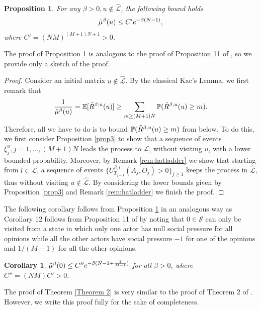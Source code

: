 \documentclass[11pt]{article}
\newtheorem{proposition}[theorem]{Proposition}
\newtheorem{corollary}[theorem]{Corollary}
\theoremstyle{definition}
\newcommand{\st}{\mathcal{S}}
\begin{document}
\begin{proposition}\label{theo2prop1}
     For any $\beta>0, u\notin\hat{\mathcal{L}}$, the following bound holds
    $$
        \Tilde{\mu}^\beta(u)\leq C'e^{-\beta(N-1)},
    $$
    where $C'=(NM)^{(M+1)N+1}>0$.
\end{proposition}

The proof of Proposition \ref{theo2prop1} is analogous to the proof of Proposition 11 of \cite{galves2024fastconsensusmetastabilityhighly}, so we provide only a sketch of the proof. 

\begin{proof}
Consider an initial matrix  $u\notin\hat{\mathcal{L}}$. By the classical Kac's Lemma, we first remark that
$$
\frac{1}{\Tilde{\mu}^\beta(u)}=\mathbb{E}[\Tilde{R}^{\beta,u}(u)]\geq \sum_{m\geq(M+1)N}\mathbb{P}(\Tilde{R}^{\beta,u}(u)\geq m).
$$
Therefore, all we have to do is to bound $\mathbb{P}(\Tilde{R}^{\beta,u}(u)\geq m)$ from below. To do this, we first consider Proposition \ref{prop3} to show that a sequence of events $\xi^u_{j}, j=1,\ldots, (M+1)N$ leads the process to $\mathcal{L}$, without visiting $u$, with a lower bounded probability. Moreover, by Remark \ref{rem:hatladder} we show that starting from $l\in \mathcal{L}$, a sequence of events $\{U^{\beta,l}_{T_{j-1}}(A_j,O_j)>0\}_{j\geq 1}$ keeps the process in $\hat{\mathcal{L}}$, thus without visiting $u \not\in \hat{\mathcal{L}}$. By considering the lower bounds given by Proposition \ref{prop3} and Remark \ref{rem:hatladder} we finish the proof. 
\end{proof}

The following corollary follows from Proposition \ref{theo2prop1} in an analogous way as Corollary 12 follows from Proposition 11 of \cite{galves2024fastconsensusmetastabilityhighly} by noting that $0\in \st$ can only be visited from a state in which only one actor has null social pressure for all opinions while all the other actors have social pressure $-1$ for one of the opinions and $1/(M-1)$ for all the other opinions.


\begin{corollary}\label{theo2coro1}
    $\Tilde{\mu}^\beta(0)\leq C''e^{-\beta(N-1+\frac{1}{M-1})}$ for all $\beta>0$, where $C''=(NM)C'>0.$
\end{corollary}


The proof of Theorem \ref{Theorem 2} is very similar to the proof of Theorem $2$ of \cite{galves2024fastconsensusmetastabilityhighly}. However, we write this proof fully for the sake of completeness.
\end{document}
